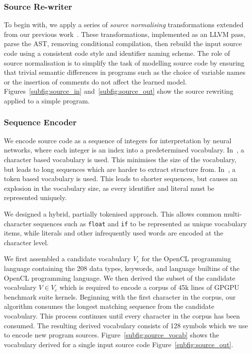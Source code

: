 \subsubsection{Source Re-writer} To begin with, we apply a series of \emph{source normalising} transformations extended from our previous work~\cite{Cummins2017a}. These transformations, implemented as an LLVM pass, parse the AST, removing conditional compilation, then rebuild the input source code using a consistent code style and identifier naming scheme. The role of source normalisation is to simplify the task of modelling source code by ensuring that trivial semantic differences in programs such as the choice of variable names or the insertion of comments do not affect the learned model. Figures~\ref{subfig:source_in} and~\ref{subfig:source_out} show the source rewriting applied to a simple program.

\subsubsection{Sequence Encoder}  We encode source code as a sequence of integers for interpretation by neural networks, where each integer is an index into a predetermined vocabulary. In~\cite{Cummins2017a}, a character based vocabulary is used. This minimises the size of the vocabulary, but leads to long sequences which are harder to extract structure from. In~\cite{Allamanis2013a}, a token based vocabulary is used. This leads to shorter sequences, but causes an explosion in the vocabulary size, as every identifier and literal must be represented uniquely.

We designed a hybrid, partially tokenised approach. This allows common multi-character sequences such as \texttt{float} and \texttt{if} to be represented as unique vocabulary items, while literals and other infrequently used words are encoded at the character level.

We first assembled a candidate vocabulary $V_c$ for the OpenCL programming language containing the 208 data types, keywords, and language builtins of the OpenCL programming language. We then derived the subset of the candidate vocabulary $V \in V_c$ which is required to encode a corpus of 45k lines of GPGPU benchmark suite kernels. Beginning with the first character in the corpus, our algorithm consumes the longest matching sequence from the candidate vocabulary. This process continues until every character in the corpus has been consumed. The resulting derived vocabulary consists of 128 symbols which we use to encode new program sources. Figure~\ref{subfig:source_vocab} shows the vocabulary derived for a single input source code Figure~\ref{subfig:source_out}.

